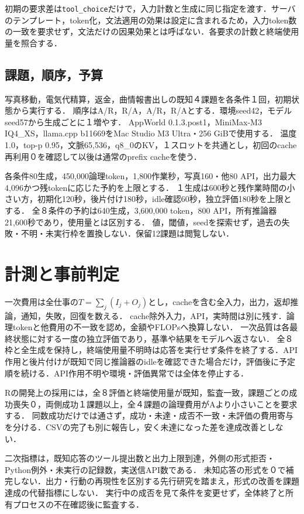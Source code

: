 \documentclass[uplatex,a4paper,twocolumn,10pt]{jsarticle}
\begin{document}
初期の要求差は\texttt{tool\_choice}だけで，入力計数と生成に同じ指定を渡す．サーバのテンプレート，token化，文法適用の効果は設定に含まれるため，入力token数の一致を要求せず，文法だけの因果効果とは呼ばない．各要求の計数と終端使用量を照合する．

\subsection{課題，順序，予算}
写真移動，電気代精算，返金，曲情報書出しの既知４課題を各条件１回，初期状態から実行する．
順序はA/R，R/A，A/R，R/Aとする．環境seed42，モデルseed57から生成ごとに１増やす．
AppWorld 0.1.3.post1，MiniMax-M3 IQ4\_XS，llama.cpp b11669をMac Studio M3 Ultra・256 GiBで使用する．
温度1.0，top-p 0.95，文脈65,536，q8\_0のKV，１スロットを共通とし，初回のcache再利用０を確認して以後は通常のprefix cacheを使う．

各条件80生成，450,000論理token，1,800作業秒，写真160・他80 API，出力最大4,096かつ残tokenに応じた予約を上限とする．
１生成は600秒と残作業時間の小さい方，初期化120秒，後片付け180秒，idle確認60秒，独立評価180秒を上限とする．
全８条件の予約は640生成，3,600,000 token，800 API，所有推論器21,600秒であり，使用量とは区別する．
値，閾値，seedを探索せず，過去の失敗・不明・未実行枠を置換しない．保留12課題は閲覧しない．

\section{計測と事前判定}
一次費用は全仕事の$T=\sum_j(I_j+O_j)$とし，cacheを含む全入力，出力，返却推論，通知，失敗，回復を数える．
cache除外入力，API，実時間は別に残す．論理tokenと他費用の不一致\cite{costproxy}を認め，金額やFLOPsへ換算しない．
一次品質は各最終状態に対する一度の独立評価であり，基準や結果をモデルへ返さない．
全８枠と全生成を保持し，終端使用量不明時は応答を実行せず条件を終了する．API作用と後片付けが既知で同じ推論器のidleを確認できた場合だけ，評価後に予定順を続ける．API作用不明や環境・評価異常では全体を停止する．

Rの開発上の採用には，全８評価と終端使用量が既知，監査一致，課題ごとの成功喪失０，両側成功１課題以上，全４課題の論理費用がAより小さいことを要求する．
同数成功だけでは通さず，成功・未達・成否不一致・未評価の費用寄与を分ける．CSVの完了も別に報告し，安く未達になった差を達成改善としない．

二次指標は，既知応答のツール提出数と出力上限到達，外側の形式拒否・Python例外・未実行の記録数，実送信API数である．
未知応答の形式を０で補完しない．出力・行動の再現性を区別する先行研究\cite{consistency}を踏まえ，形式の改善を課題達成の代替指標にしない．
実行中の成否を見て条件を変更せず，全体終了と所有プロセスの不在確認後に監査する．
\end{document}
